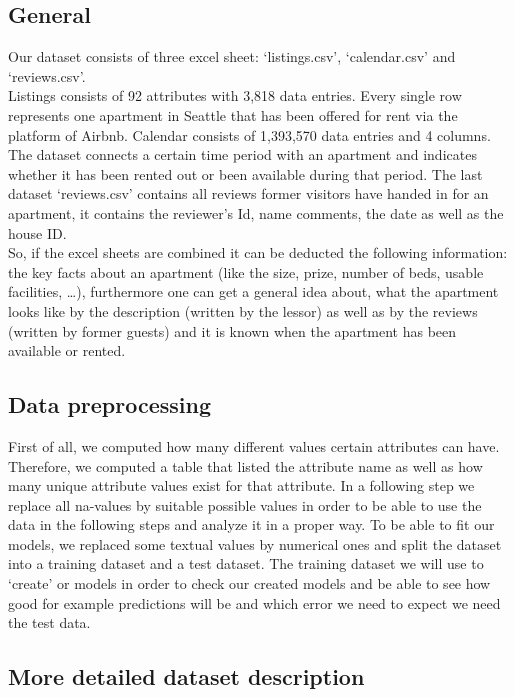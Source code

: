 \subsection {General}
\noindent Our dataset consists of three excel sheet: ‘listings.csv’, ‘calendar.csv’ and ‘reviews.csv’.\\
Listings consists of 92 attributes with 3,818 data entries. Every single row represents one apartment in Seattle that has been offered for rent via the platform of Airbnb. Calendar consists of 1,393,570 data entries and 4 columns. The dataset connects a certain time period with an apartment and indicates whether it has been rented out or been available during that period. The last dataset ‘reviews.csv’ contains all reviews former visitors have handed in for an apartment, it contains the reviewer’s Id, name comments, the date as well as the house ID.\\So, if the excel sheets are combined it can be deducted the following information: the key facts about an apartment (like the size, prize, number of beds, usable facilities, …), furthermore one can get a general idea about, what the apartment looks like by the description (written by the lessor) as well as by the reviews (written by former guests) and it is known when the apartment has been available or rented.

\subsection {Data preprocessing}
First of all, we computed how many different values certain attributes can have. Therefore, we computed a table that listed the attribute name as well as how many unique attribute values exist for that attribute.
In a following step we replace all na-values by suitable possible values in order to be able to use the data in the following steps and analyze it in a proper way. To be able to fit our models, we replaced some textual values by numerical ones and split the dataset into a training dataset and a test dataset. The training dataset we will use to ‘create’ or models in order to check our created models and be able to see how good for example predictions will be and which error we need to expect we need the test data.

\subsection {More detailed dataset description}

